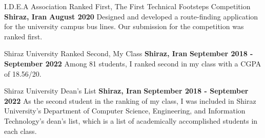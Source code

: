 

\begin{cventries}

  \cventry
    {I.D.E.A Association} %
    {Ranked First, The First Technical Footsteps Competition} %
    {\textbf{Shiraz, Iran}} %
    {\textbf{August 2020}} %
    {
      Designed and developed a route-finding application for the university campus bus lines. Our submission for the competition was ranked first. 
    }

  \cventry
    {Shiraz University} %
    {Ranked Second, My Class} %
    {\textbf{Shiraz, Iran}} %
    {\textbf{September 2018 - September 2022}} %
    {
      Among 81 students, I ranked second in my class with a CGPA of 18.56/20.
    }

  \cventry
    {Shiraz University} %
    {Dean’s List} %
    {\textbf{Shiraz, Iran}} %
    {\textbf{September 2018 - September 2022}} %
    {
      As the second student in the ranking of my class, I was included in Shiraz University’s Department of Computer Science, Engineering, and Information Technology’s dean’s list, which is a list of academically accomplished students in each class.
    }

\end{cventries}

